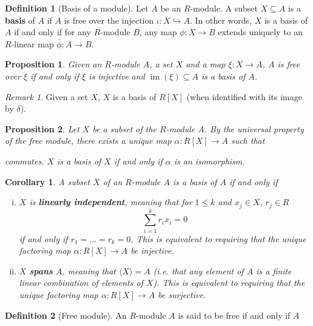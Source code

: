 \documentclass[a4paper,12pt,parskip=half*,chapterprefix=true,numbers=noendperiod]{scrreprt}
\newcommand{\opname}{\operatorname}
\newtheorem{proposition}{Proposition}[section]
\newtheorem{corollary}{Corollary}[section]
\theoremstyle{definition}
\newtheorem{definition}{Definition}[section]
\theoremstyle{remark}
\newtheorem*{remark}{Remark}
\begin{document}
\begin{definition}[Basis of a module]
	Let $A$ be an $R$-module. A subset $X\subseteq A$ is a \textbf{basis} of $A$ if $A$ is free over the injection $\iota:X\hookrightarrow A$. In other words, $X$ is a basis of $A$ if and only if for any $R$-module $B$, any map $\phi:X\to B$ extends uniquely to an $R$-linear map $\bar{\phi}:A\to B$. 
\end{definition}

\begin{proposition}
	Given an $R$-module $A$, a set $X$ and a map $\xi:X\to A$, $A$ is free over $\xi$ if and only if $\xi$ is injective and $\opname{im}(\xi)\subseteq A$ is a basis of $A$.
\end{proposition}
\begin{remark}
	Given a set $X$, $X$ is a basis of $R[X]$ (when identified with its image by $\delta$).
\end{remark}

\begin{proposition}
	Let $X$ be a subset of the $R$-module $A$. By the universal property of the free module, there exists a unique map $\alpha:R[X]\to A$ such that
	\begin{figure}[H]
	\centering
	\end{figure}
	commutes. $X$ is a basis of $X$ if and only if $\alpha$ is an isomorphism.
\end{proposition}

\begin{corollary}
	A subset $X$ of an $R$-module $A$ is a basis of $A$ if and only if
	\begin{enumerate}[(i)]
		\item $X$ is \textbf{linearly independent}, meaning that for $1\leq k$ and $x_j\in X$, $r_j\in R$
		\begin{equation*}
			\sum_{i=1}^kr_ix_i=0
		\end{equation*}
		if and only if $r_1=...=r_k=0$. This is equivalent to requiring that the unique factoring map $\alpha:R[X]\to A$ be injective.
		\item $X$ \textbf{spans} $A$, meaning that $\langle X\rangle=A$ (i.e. that any element of $A$ is a finite linear combination of elements of $X$). This is equivalent to requiring that the unique factoring map $\alpha:R[X]\to A$ be surjective. 
	\end{enumerate}
\end{corollary}

\begin{definition}[Free module]
	An $R$-module $A$ is said to be free if and only if $A$
\end{definition}




\printbibliography
\end{document}
